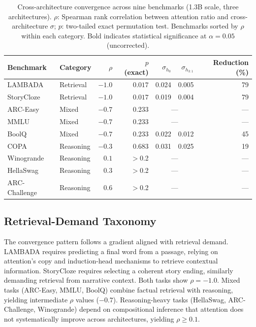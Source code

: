 \documentclass[11pt]{article}
\begin{document}
\begin{table}[t]
\centering
\caption{Cross-architecture convergence across nine benchmarks (1.3B scale, three architectures). $\rho$: Spearman rank correlation between attention ratio and cross-architecture $\sigma$; $p$: two-tailed exact permutation test. Benchmarks sorted by $\rho$ within each category. Bold indicates statistical significance at $\alpha = 0.05$ (uncorrected).}
\label{tab:benchmarks}
\small
\begin{tabular}{llrrrrr}
\toprule
Benchmark & Category & $\rho$ & $p$ (exact) & $\sigma_{h_0}$ & $\sigma_{h_{3:1}}$ & Reduction (\%) \\
\midrule
LAMBADA & Retrieval & $\mathbf{{-}1.0}$ & $\mathbf{0.017}$ & 0.024 & 0.005 & 79 \\
StoryCloze & Retrieval & $\mathbf{{-}1.0}$ & $\mathbf{0.017}$ & 0.019 & 0.004 & 79 \\
\midrule
ARC-Easy & Mixed & ${-}0.7$ & 0.233 & \multicolumn{2}{c}{---} & --- \\
MMLU & Mixed & ${-}0.7$ & 0.233 & \multicolumn{2}{c}{---} & --- \\
BoolQ & Mixed & ${-}0.7$ & 0.233 & 0.022 & 0.012 & 45 \\
\midrule
COPA & Reasoning & ${-}0.3$ & 0.683 & 0.031 & 0.025 & 19 \\
Winogrande & Reasoning & $0.1$ & $>$0.2 & \multicolumn{2}{c}{---} & --- \\
HellaSwag & Reasoning & $0.3$ & $>$0.2 & \multicolumn{2}{c}{---} & --- \\
ARC-Challenge & Reasoning & $0.6$ & $>$0.2 & \multicolumn{2}{c}{---} & --- \\
\bottomrule
\end{tabular}
\end{table}

\subsection{Retrieval-Demand Taxonomy}
\label{sec:taxonomy}

The convergence pattern follows a gradient aligned with retrieval demand.
LAMBADA requires predicting a final word from a passage, relying on attention's copy and induction-head mechanisms to retrieve contextual information.
StoryCloze requires selecting a coherent story ending, similarly demanding retrieval from narrative context.
Both tasks show $\rho = {-}1.0$.
Mixed tasks (ARC-Easy, MMLU, BoolQ) combine factual retrieval with reasoning, yielding intermediate $\rho$ values (${-}0.7$).
Reasoning-heavy tasks (HellaSwag, ARC-Challenge, Winogrande) depend on compositional inference that attention does not systematically improve across architectures, yielding $\rho \geq 0.1$.
\end{document}
